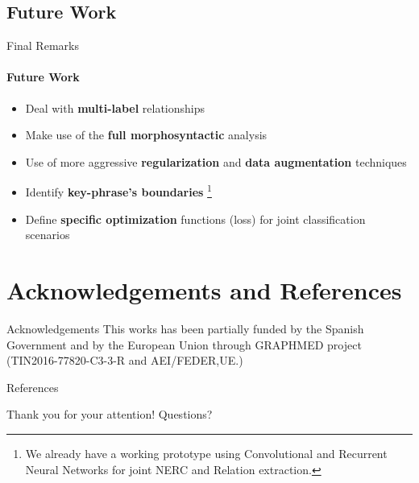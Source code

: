 \documentclass{beamer}
\begin{document}
\subsection{Future Work}

\begin{frame}{Final Remarks}
\framesubtitle{Future Work}

\begin{itemize}
  \item Deal with \textbf{multi-label} relationships
  \item Make use of the \textbf{full morphosyntactic} analysis
  \item Use of more aggressive \textbf{regularization} and \textbf{data augmentation} techniques
  \item Identify \textbf{key-phrase's boundaries} \footnote{We already have a working prototype using Convolutional and Recurrent Neural Networks for joint NERC and Relation extraction.}
  \item Define \textbf{specific optimization} functions (loss) for joint classification scenarios
\end{itemize}

\end{frame}


\section*{Acknowledgements and References}

%
%

\begin{frame}{Acknowledgements}
  \centering
This works has been partially funded by the Spanish Government and by the European Union through GRAPHMED project (TIN2016-77820-C3-3-R and AEI/FEDER,UE.)

\end{frame}

\begin{frame}[allowframebreaks]{References}


\end{frame}

\begin{frame}
\centering
\Huge Thank you for your attention!
\Huge Questions?
\end{frame}



\end{document}
